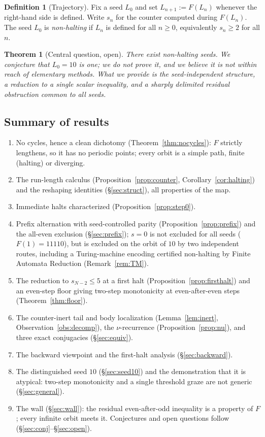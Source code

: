 \documentclass[11pt,reqno]{amsart}
\theoremstyle{plain}
\newtheorem{thm}[theorem]{Theorem}
\theoremstyle{definition}
\newtheorem{definition}{Definition}
\theoremstyle{remark}
\begin{document}
\begin{definition}[Trajectory]\label{def:traj}
Fix a seed $L_0$ and set $L_{n+1}:=F(L_n)$ whenever the right-hand side is defined. Write $s_n$ for the counter computed during $F(L_n)$. The seed $L_0$ is \emph{non-halting} if $L_n$ is defined for all $n\ge 0$, equivalently $s_n\ge 2$ for all $n$.
\end{definition}

\begin{thm}[Central question, open]\label{thm:central}
There exist non-halting seeds. We conjecture that $L_0=10$ is one; we do not prove it, and we believe it is not within reach of elementary methods. What we provide is the seed-independent structure, a reduction to a single scalar inequality, and a sharply delimited residual obstruction common to all seeds.
\end{thm}

\subsection{Summary of results}
\begin{enumerate}[label=(\roman*)]
\item No cycles, hence a clean dichotomy (Theorem~\ref{thm:nocycles}): $F$ strictly lengthens, so it has no periodic points; every orbit is a simple path, finite (halting) or diverging.
\item The run-length calculus (Proposition~\ref{prop:counter}, Corollary~\ref{cor:halting}) and the reshaping identities (\S\ref{sec:struct}), all properties of the map.
\item Immediate halts characterized (Proposition~\ref{prop:step0}).
\item Prefix alternation with seed-controlled parity (Proposition~\ref{prop:prefix}) and the all-even exclusion (\S\ref{sec:prefix}); $s=0$ is not excluded for all seeds ($F(1)=11110$), but is excluded on the orbit of $10$ by two independent routes, including a Turing-machine encoding certified non-halting by Finite Automata Reduction (Remark~\ref{rem:TM}).
\item The reduction to $s_{N-2}\le 5$ at a first halt (Proposition~\ref{prop:firsthalt}) and an even-step floor giving two-step monotonicity at even-after-even steps (Theorem~\ref{thm:floor}).
\item The counter-inert tail and body localization (Lemma~\ref{lem:inert}, Observation~\ref{obs:decomp}), the $\nu$-recurrence (Proposition~\ref{prop:nu}), and three exact conjugacies (\S\ref{sec:equiv}).
\item The backward viewpoint and the first-halt analysis (\S\ref{sec:backward}).
\item The distinguished seed $10$ (\S\ref{sec:seed10}) and the demonstration that it is atypical: two-step monotonicity and a single threshold graze are not generic (\S\ref{sec:general}).
\item The wall (\S\ref{sec:wall}): the residual even-after-odd inequality is a property of $F$; every infinite orbit meets it. Conjectures and open questions follow (\S\ref{sec:conj}--\S\ref{sec:open}).
\end{enumerate}
\end{document}
